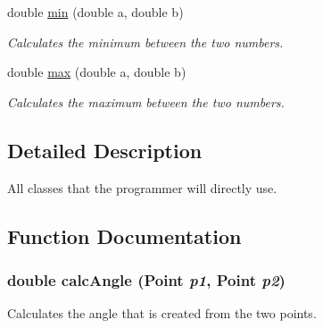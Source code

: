 \begin{CompactItemize}
double \hyperlink{group__userclasses_g82fe34140a419a1f19200091b808e4ad}{min} (double a, double b)
\begin{CompactList}\small\item\em Calculates the minimum between the two numbers. \item\end{CompactList}\item 
double \hyperlink{group__userclasses_g452d2724d2f82cc2c17f54b388232200}{max} (double a, double b)
\begin{CompactList}\small\item\em Calculates the maximum between the two numbers. \item\end{CompactList}\end{CompactItemize}


\subsection{Detailed Description}
All classes that the programmer will directly use. 

\subsection{Function Documentation}
\hypertarget{group__userclasses_gf0804c8504c8b48ce8a130a8b0727cf6}{
\subsubsection[{calcAngle}]{\setlength{\rightskip}{0pt plus 5cm}double calcAngle ({\bf Point} {\em p1}, \/  {\bf Point} {\em p2})}}
\label{group__userclasses_gf0804c8504c8b48ce8a130a8b0727cf6}


Calculates the angle that is created from the two points. 

